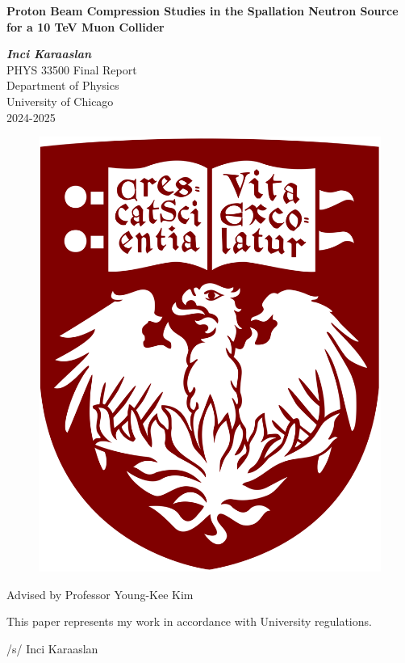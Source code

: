 \documentclass[12pt]{article}
\title{}
\author{}
\date{} %
\begin{document}
\begin{titlepage}
\centering
\Large{\textbf{Proton Beam Compression Studies in the Spallation Neutron Source for a 10 TeV Muon Collider}}
\vspace{10mm}

\Large\textit{\textbf{Inci Karaaslan}} \\
\vspace{25mm}
\large{PHYS 33500 Final Report \\ Department of Physics \\ University of Chicago \\2024-2025\\}
\begin{figure}[H]
\centering
\includegraphics[scale=0.1]{uchicago}
\end{figure}
\vspace{1mm}
\normalsize{Advised by Professor Young-Kee Kim}\\

\vfill

\vspace*{25mm}
\normalsize{This paper represents my work in accordance with University regulations.}
\begin{center} 
\normalsize{/s/ Inci Karaaslan}
\end{center}

\end{titlepage}
\end{document}

